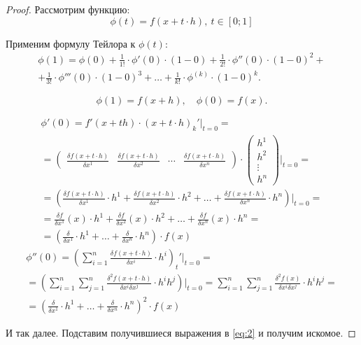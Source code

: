 \begin{proof}
    Рассмотрим функцию:
    \[
        \phi(t) = f(x + t\cdot h), \ t \in [0;1]
    \]

    Применим формулу Тейлора к $\phi(t)$:
    \begin{multline}\label{eq:2}
        \phi(1) = \phi(0) + \frac{1}{1!} \cdot \phi'(0) \cdot (1-0) + \frac{1}{2!} \cdot \phi''(0) \cdot (1-0)^2 + \\
        + \frac{1}{3!} \cdot \phi'''(0) \cdot (1-0)^3 + \ldots + \frac{1}{k!} \cdot \phi^{(k)} \cdot (1-0)^k.
    \end{multline}

    \[
        \phi(1) = f(x + h), \quad \phi(0) = f(x).
    \]

    \begin{multline*}
        \phi'(0) = f'(x + th) \cdot (x + t\cdot h)_k'\Big|_{t = 0} = \\
        = \left(\begin{matrix}
                \frac{\delta f(x + t\cdot h)}{\delta x^1} & \frac{\delta f(x + t\cdot h)}{\delta x^2} & \cdots & \frac{\delta f(x + t\cdot h)}{\delta x^n}
            \end{matrix}\right) \cdot \left(\begin{matrix}
                h^1 \\ h^2 \\ \vdots \\ h^n
            \end{matrix}\right)\Bigg|_{t=0} = \\
        = \left(\frac{\delta f(x + t\cdot h)}{\delta x^1} \cdot h^1 + \frac{\delta f(x+t\cdot h)}{\delta x^2} \cdot h^2 + \ldots + \frac{\delta f(x + t\cdot h)}{\delta x^n}\cdot h^n\right) \Bigg|_{t=0} = \\
        = \frac{\delta f}{\delta x^1}(x)\cdot h^1 + \frac{\delta f}{\delta x^2}(x)\cdot h^2 + \ldots + \frac{\delta f}{\delta x^n}(x) \cdot h^n = \\
        = \left(\frac{\delta}{\delta x^1} \cdot h^1 + \ldots + \frac{\delta}{\delta x^n}\cdot h^n\right)\cdot f(x)
    \end{multline*}
    \begin{multline*}
        \phi''(0) = \left(\sum_{i = 1}^{n} \frac{\delta f(x + t\cdot h)}{\delta x^i}\cdot h^i\right)_t' \Bigg|_{t = 0} = \\
        = \left(\sum_{i = 1}^{n} \sum_{j = 1}^{n} \frac{\delta^2 f(x + t\cdot h)}{\delta x^i \delta x^j}\cdot h^i h^j\right) \Bigg|_{t = 0} = \sum_{i = 1}^{n}\sum_{j = 1}^{n}\frac{\delta^2 f(x)}{\delta x^i \delta x^j}\cdot h^i h^j = \\
        = \left(\frac{\delta}{\delta x^1}\cdot h^1 + \ldots + \frac{\delta}{\delta x^n}\cdot h^n\right)^2 \cdot f(x)
    \end{multline*}

    И так далее. Подставим получившиеся выражения в \ref{eq:2} и получим искомое.
\end{proof}

